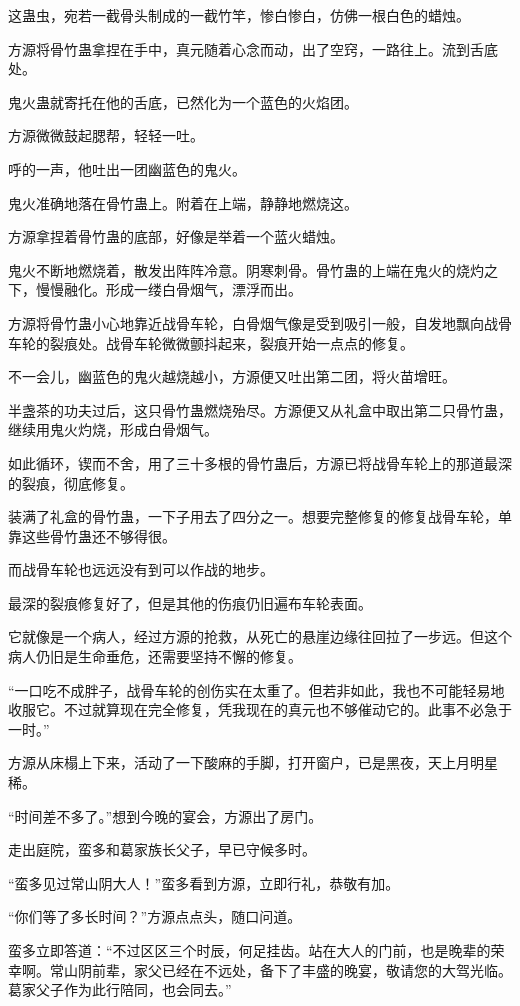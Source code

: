 \begin{this_body}
这蛊虫，宛若一截骨头制成的一截竹竿，惨白惨白，仿佛一根白色的蜡烛。

方源将骨竹蛊拿捏在手中，真元随着心念而动，出了空窍，一路往上。流到舌底处。

鬼火蛊就寄托在他的舌底，已然化为一个蓝色的火焰团。

方源微微鼓起腮帮，轻轻一吐。

呼的一声，他吐出一团幽蓝色的鬼火。

鬼火准确地落在骨竹蛊上。附着在上端，静静地燃烧这。

方源拿捏着骨竹蛊的底部，好像是举着一个蓝火蜡烛。

鬼火不断地燃烧着，散发出阵阵冷意。阴寒刺骨。骨竹蛊的上端在鬼火的烧灼之下，慢慢融化。形成一缕白骨烟气，漂浮而出。

方源将骨竹蛊小心地靠近战骨车轮，白骨烟气像是受到吸引一般，自发地飘向战骨车轮的裂痕处。战骨车轮微微颤抖起来，裂痕开始一点点的修复。

不一会儿，幽蓝色的鬼火越烧越小，方源便又吐出第二团，将火苗增旺。

半盏茶的功夫过后，这只骨竹蛊燃烧殆尽。方源便又从礼盒中取出第二只骨竹蛊，继续用鬼火灼烧，形成白骨烟气。

如此循环，锲而不舍，用了三十多根的骨竹蛊后，方源已将战骨车轮上的那道最深的裂痕，彻底修复。

装满了礼盒的骨竹蛊，一下子用去了四分之一。想要完整修复的修复战骨车轮，单靠这些骨竹蛊还不够得很。

而战骨车轮也远远没有到可以作战的地步。

最深的裂痕修复好了，但是其他的伤痕仍旧遍布车轮表面。

它就像是一个病人，经过方源的抢救，从死亡的悬崖边缘往回拉了一步远。但这个病人仍旧是生命垂危，还需要坚持不懈的修复。

“一口吃不成胖子，战骨车轮的创伤实在太重了。但若非如此，我也不可能轻易地收服它。不过就算现在完全修复，凭我现在的真元也不够催动它的。此事不必急于一时。”

方源从床榻上下来，活动了一下酸麻的手脚，打开窗户，已是黑夜，天上月明星稀。

“时间差不多了。”想到今晚的宴会，方源出了房门。

走出庭院，蛮多和葛家族长父子，早已守候多时。

“蛮多见过常山阴大人！”蛮多看到方源，立即行礼，恭敬有加。

“你们等了多长时间？”方源点点头，随口问道。

蛮多立即答道：“不过区区三个时辰，何足挂齿。站在大人的门前，也是晚辈的荣幸啊。常山阴前辈，家父已经在不远处，备下了丰盛的晚宴，敬请您的大驾光临。葛家父子作为此行陪同，也会同去。”


\end{this_body}
